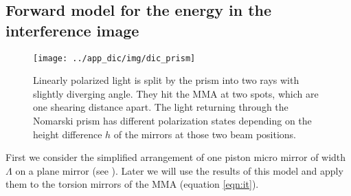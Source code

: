 \subsection{Forward model for the energy in the interference image}
\begin{figure}[htb]
  \centering
  \texttt{[image: ../app\_dic/img/dic\_prism]}
  \caption{ Linearly polarized light is split by the prism into two
    rays with slightly diverging angle. They hit the MMA at two spots,
    which are one shearing distance apart. The light returning through
    the Nomarski prism has different polarization states depending on
    the height difference $h$ of the mirrors at those two beam
    positions.}
  \label{fig:prism}
\end{figure}
First we consider the simplified arrangement of one piston micro
mirror of width $\Lambda$ on a plane mirror (see
). Later we will use the results of this model and
apply them to the torsion mirrors of the MMA (equation
\ref{eqn:it}). 

